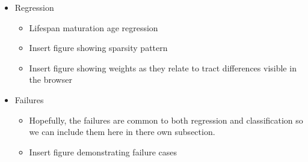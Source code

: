 \begin{itemize}
  \item Regression
    \begin{itemize}
      \item Lifespan maturation age regression
      \item Insert figure showing sparsity pattern
      \item Insert figure showing weights as they relate to tract differences visible in the browser
    \end{itemize}
  \item Failures
    \begin{itemize}
      \item Hopefully, the failures are common to both regression
        and classification so we can include them here in there own
        subsection.
      \item Insert figure demonstrating failure cases
    \end{itemize}
\end{itemize}
